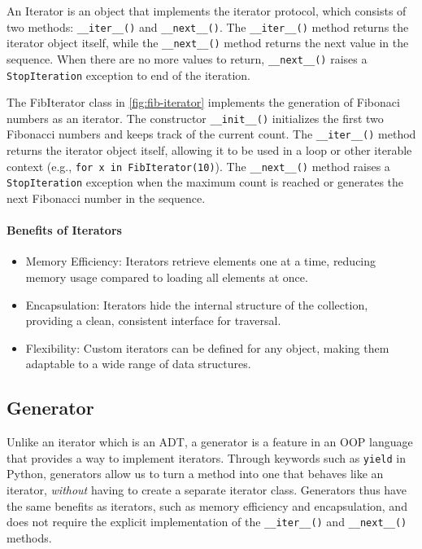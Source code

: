 \documentclass[oneside,11pt,dvipsnames]{book}
\newcommand{\code}[1]{\texttt{#1}}
\begin{document}
An Iterator is an object that implements the iterator protocol, which consists of two methods: \code{\_\_iter\_\_()} and \code{\_\_next\_\_()}. The \code{\_\_iter\_\_()} method returns the iterator object itself, while the \code{\_\_next\_\_()} method returns the next value in the sequence. When there are no more values to return, \code{\_\_next\_\_()} raises a \code{StopIteration} exception to end of the iteration.

The FibIterator class in \autoref{fig:fib-iterator} implements the generation of Fibonaci numbers as an iterator. The constructor \code{\_\_init\_\_()} initializes the first two Fibonacci numbers and keeps track of the current count. The \code{\_\_iter\_\_()} method returns the iterator object itself, allowing it to be used in a loop or other iterable context (e.g., \code{for x in FibIterator(10)}). The \code{\_\_next\_\_()} method raises a \code{StopIteration} exception when the maximum count is reached or generates the next Fibonacci number in the sequence. 


\paragraph{Benefits of Iterators}
\begin{itemize}
\item Memory Efficiency: Iterators retrieve elements one at a time, reducing memory usage compared to loading all elements at once.
\item Encapsulation: Iterators hide the internal structure of the collection, providing a clean, consistent interface for traversal.
\item Flexibility: Custom iterators can be defined for any object, making them adaptable to a wide range of data structures.
\end{itemize}


\subsection{Generator}\label{sec:generators}
Unlike an iterator which is an ADT, a generator is a feature in an OOP language that provides a way to implement iterators. Through keywords such as \code{yield} in Python, generators allow us to turn a method into one that behaves like an iterator, \emph{without} having to create a separate iterator class. Generators thus have the same benefits as iterators, such as memory efficiency and encapsulation, and does not require the explicit implementation of the \code{\_\_iter\_\_()} and \code{\_\_next\_\_()} methods.
\end{document}
